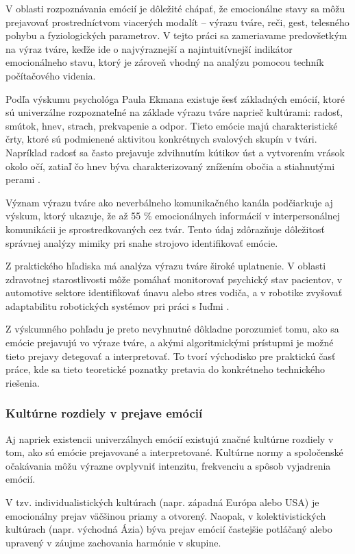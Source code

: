 V oblasti rozpoznávania emócií je dôležité chápať, že emocionálne stavy sa môžu prejavovať prostredníctvom viacerých modalít – výrazu tváre, reči, gest, telesného pohybu a fyziologických parametrov. 
V tejto práci sa zameriavame predovšetkým na výraz tváre, keďže ide o najvýraznejší a najintuitívnejší 
indikátor emocionálneho stavu, ktorý je zároveň vhodný na analýzu pomocou techník počítačového videnia.

Podľa výskumu psychológa Paula Ekmana existuje šesť základných emócií, ktoré sú univerzálne rozpoznateľné na základe výrazu tváre naprieč kultúrami: radosť, smútok, hnev, strach, prekvapenie a odpor. 
Tieto emócie majú charakteristické črty, ktoré sú podmienené aktivitou konkrétnych svalových skupín v tvári. 
Napríklad radosť sa často prejavuje zdvihnutím kútikov úst a vytvorením vrások okolo očí, zatiaľ čo hnev býva charakterizovaný znížením obočia a stiahnutými perami \cite{article03}.

Význam výrazu tváre ako neverbálneho komunikačného kanála podčiarkuje aj výskum, ktorý ukazuje, že až 55 \% emocionálnych informácií v interpersonálnej komunikácii je sprostredkovaných cez tvár. 
Tento údaj zdôrazňuje dôležitosť správnej analýzy mimiky pri snahe strojovo identifikovať emócie.

Z praktického hľadiska má analýza výrazu tváre široké uplatnenie. V oblasti zdravotnej starostlivosti môže pomáhať monitorovať psychický stav pacientov, v automotive sektore identifikovať únavu alebo stres vodiča, 
a v robotike zvyšovať adaptabilitu robotických systémov pri práci s ľuďmi .

Z výskumného pohľadu je preto nevyhnutné dôkladne porozumieť tomu, ako sa emócie prejavujú vo výraze tváre, a akými algoritmickými prístupmi je možné tieto prejavy detegovať a interpretovať. To tvorí východisko pre praktickú časť práce, 
kde sa tieto teoretické poznatky pretavia do konkrétneho technického riešenia.

\subsubsection{Kultúrne rozdiely v prejave emócií}
Aj napriek existencii univerzálnych emócií existujú značné kultúrne rozdiely v tom, ako sú emócie prejavované a interpretované. Kultúrne normy a spoločenské očakávania môžu výrazne ovplyvniť intenzitu, frekvenciu a spôsob vyjadrenia emócií.

V tzv. individualistických kultúrach (napr. západná Európa alebo USA) je emocionálny prejav väčšinou priamy a otvorený. Naopak, v kolektivistických kultúrach (napr. východná Ázia) býva prejav emócií častejšie potláčaný alebo upravený v 
záujme zachovania harmónie v skupine.

